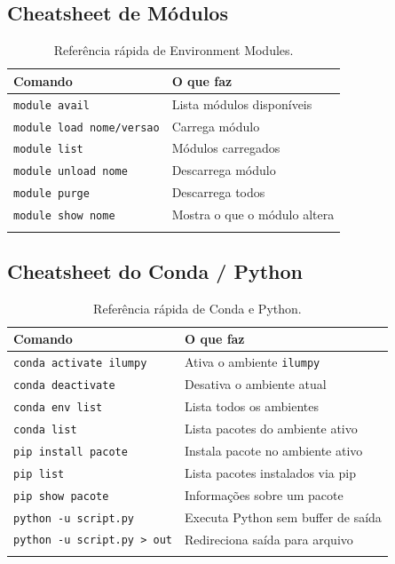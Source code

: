 \documentclass[11pt, a4paper]{article}
\newcommand{\cmd}[1]{\texttt{\textcolor{codeblue}{#1}}}
\begin{document}
\subsection{Cheatsheet de Módulos}

\begin{longtable}{ll}
  \toprule
  \textbf{Comando} & \textbf{O que faz} \\
  \midrule
  \endhead
  \cmd{module avail} & Lista módulos disponíveis \\
  \cmd{module load nome/versao} & Carrega módulo \\
  \cmd{module list} & Módulos carregados \\
  \cmd{module unload nome} & Descarrega módulo \\
  \cmd{module purge} & Descarrega todos \\
  \cmd{module show nome} & Mostra o que o módulo altera \\
  \bottomrule
  \caption{Referência rápida de Environment Modules.}
\end{longtable}

\subsection{Cheatsheet do Conda / Python}

\begin{longtable}{ll}
  \toprule
  \textbf{Comando} & \textbf{O que faz} \\
  \midrule
  \endhead
  \cmd{conda activate ilumpy} & Ativa o ambiente \texttt{ilumpy} \\
  \cmd{conda deactivate} & Desativa o ambiente atual \\
  \cmd{conda env list} & Lista todos os ambientes \\
  \cmd{conda list} & Lista pacotes do ambiente ativo \\
  \cmd{pip install pacote} & Instala pacote no ambiente ativo \\
  \cmd{pip list} & Lista pacotes instalados via pip \\
  \cmd{pip show pacote} & Informações sobre um pacote \\
  \cmd{python -u script.py} & Executa Python sem buffer de saída \\
  \cmd{python -u script.py > out} & Redireciona saída para arquivo \\
  \bottomrule
  \caption{Referência rápida de Conda e Python.}
\end{longtable}
\end{document}
